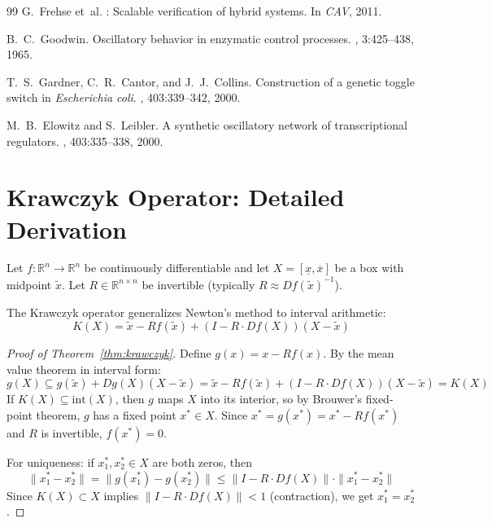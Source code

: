 \documentclass[11pt]{article}
\newcommand{\R}{\mathbb{R}}
\newcommand{\norm}[1]{\|#1\|}
\begin{document}
\begin{thebibliography}{99}
G.~Frehse et~al.
: Scalable verification of hybrid systems.
\newblock In {\em CAV}, 2011.

B.~C.~Goodwin.
\newblock Oscillatory behavior in enzymatic control processes.
, 3:425--438, 1965.

T.~S.~Gardner, C.~R.~Cantor, and J.~J.~Collins.
\newblock Construction of a genetic toggle switch in \emph{Escherichia coli}.
, 403:339--342, 2000.

M.~B.~Elowitz and S.~Leibler.
\newblock A synthetic oscillatory network of transcriptional regulators.
, 403:335--338, 2000.
\end{thebibliography}

\appendix

\section{Krawczyk Operator: Detailed Derivation}
\label{app:krawczyk}

Let $f: \R^n \to \R^n$ be continuously differentiable and let $X = [\underline{x}, \overline{x}]$ be a box with midpoint $\tilde{x}$.
Let $R \in \R^{n \times n}$ be invertible (typically $R \approx Df(\tilde{x})^{-1}$).

The Krawczyk operator generalizes Newton's method to interval arithmetic:
\[
K(X) = \tilde{x} - R f(\tilde{x}) + (I - R \cdot Df(X))(X - \tilde{x})
\]

\begin{proof}[Proof of Theorem~\ref{thm:krawczyk}]
Define $g(x) = x - Rf(x)$.
By the mean value theorem in interval form:
\[
g(X) \subseteq g(\tilde{x}) + Dg(X)(X - \tilde{x}) = \tilde{x} - Rf(\tilde{x}) + (I - R \cdot Df(X))(X - \tilde{x}) = K(X)
\]
If $K(X) \subseteq \mathrm{int}(X)$, then $g$ maps $X$ into its interior, so by Brouwer's fixed-point theorem, $g$ has a fixed point $x^* \in X$.
Since $x^* = g(x^*) = x^* - Rf(x^*)$ and $R$ is invertible, $f(x^*) = 0$.

For uniqueness: if $x_1^*, x_2^* \in X$ are both zeros, then
\[
\norm{x_1^* - x_2^*} = \norm{g(x_1^*) - g(x_2^*)} \leq \norm{I - R \cdot Df(X)} \cdot \norm{x_1^* - x_2^*}
\]
Since $K(X) \subset X$ implies $\norm{I - R \cdot Df(X)} < 1$ (contraction), we get $x_1^* = x_2^*$.
\end{proof}
\end{document}
